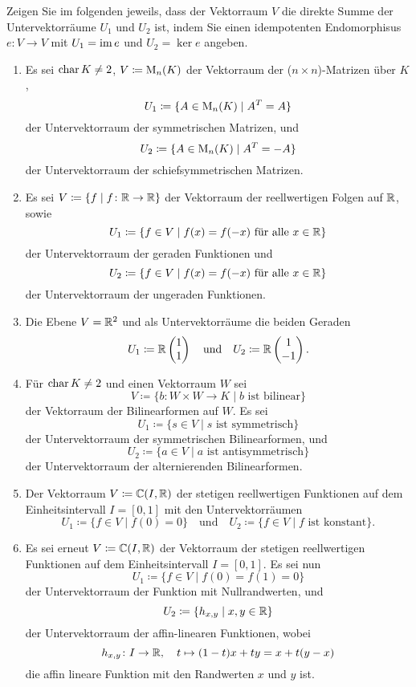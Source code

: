 \documentclass[a4paper,10pt]{scrartcl}
\begin{document}
\begin{question}
  Zeigen Sie im folgenden jeweils, dass der Vektorraum $V$ die direkte Summe der Untervektorräume $U_1$ und $U_2$ ist, indem Sie einen idempotenten Endomorphisus $e \colon V \to V$ mit $U_1 = \operatorname{im} e$ und $U_2 = \ker e$ angeben.
  \begin{enumerate}[leftmargin=*]
    \item
      Es sei $\operatorname{char} K \neq 2$, $V \coloneqq \operatorname{M}_n(K)$ der Vektorraum der ($n \times n$)-Matrizen über $K$,
      \[
        U_1 \coloneqq \{ A \in \operatorname{M}_n(K) \mid A^T = A \}
      \]
      der Untervektorraum der symmetrischen Matrizen, und
      \[
        U_2 \coloneqq \{ A \in \operatorname{M}_n(K) \mid A^T = -A \}
      \]
      der Untervektorraum der schiefsymmetrischen Matrizen.
    \item
      Es sei $V \coloneqq \{ f \mid f \colon \mathbb{R} \to \mathbb{R} \}$ der Vektorraum der reellwertigen Folgen auf $\mathbb{R}$, sowie
      \[
        U_1 \coloneqq \{ f \in V \mid \text{$f(x) = f(-x)$ für alle $x \in \mathbb{R}$} \}
      \]
      der Untervektorraum der geraden Funktionen und
      \[
        U_2 \coloneqq \{ f \in V \mid \text{$f(x) = f(-x)$ für alle $x \in \mathbb{R}$} \}
      \]
      der Untervektorraum der ungeraden Funktionen.
    \item
      Die Ebene $V = \mathbb{R}^2$ und als Untervektorräume die beiden Geraden
      \[
        U_1 \coloneqq \mathbb{R} \begin{pmatrix} 1 \\  1 \end{pmatrix}
        \quad\text{und}\quad
        U_2 \coloneqq \mathbb{R} \begin{pmatrix} 1 \\ -1 \end{pmatrix}.
      \]
    \item
      Für $\operatorname{char} K \neq 2$ und einen Vektorraum $W$ sei
      \[
                  V
        \coloneqq \{b \colon W \times W \to K \mid \text{$b$ ist bilinear}\}
      \]
      der Vektorraum der Bilinearformen auf $W$.
      Es sei
      \[
                  U_1
        \coloneqq \{ s \in V \mid \text{$s$ ist symmetrisch} \}
      \]
      der Untervektorraum der symmetrischen Bilinearformen, und
      \[
                  U_2
        \coloneqq \{ a \in V \mid \text{$a$ ist antisymmetrisch} \}
      \]
      der Untervektorraum der alternierenden Bilinearformen.
    \item
      Der Vektorraum $V \coloneqq \mathbb{C}(I, \mathbb{R})$ der stetigen reellwertigen Funktionen auf dem Einheitsintervall $I = [0,1]$ mit den Untervektorräumen
      \[
        U_1 \coloneqq \{f \in V \mid f(0) = 0\}
        \quad\text{und}\quad
        U_2 \coloneqq \{f \in V \mid \text{$f$ ist konstant}\}.
      \]
    \item
      Es sei erneut $V \coloneqq \mathbb{C}(I, \mathbb{R})$ der Vektorraum der stetigen reellwertigen Funktionen auf dem Einheitsintervall $I = [0,1]$.
     Es sei nun
      \[
        U_1 \coloneqq \{ f \in V \mid f(0) = f(1) = 0 \}
      \]
      der Untervektorraum der Funktion mit Nullrandwerten, und
      \[
        U_2 \coloneqq \{ h_{x,y} \mid x, y \in \mathbb{R} \}
      \]
      der Untervektorraum der affin-linearen Funktionen, wobei
      \[
        h_{x,y} \colon I \to \mathbb{R},
        \quad
        t \mapsto (1-t)x + ty = x + t(y-x)
      \]
      die affin lineare Funktion mit den Randwerten $x$ und $y$ ist.
      

\end{enumerate}
\end{question}
\end{document}
